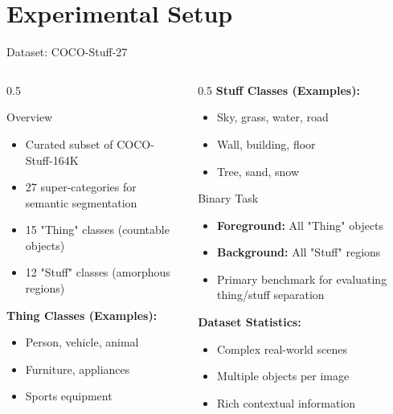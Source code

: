 \documentclass[aspectratio=169]{beamer}
\begin{document}
\section{Experimental Setup}
\begin{frame}{Dataset: COCO-Stuff-27}
\begin{columns}
\begin{column}{0.5\textwidth}
\begin{block}{Overview}
\begin{itemize}
    \item Curated subset of COCO-Stuff-164K
    \item 27 super-categories for semantic segmentation
    \item 15 "Thing" classes (countable objects)
    \item 12 "Stuff" classes (amorphous regions)
\end{itemize}
\end{block}

\textbf{Thing Classes (Examples):}
\begin{itemize}
    \item Person, vehicle, animal
    \item Furniture, appliances
    \item Sports equipment
\end{itemize}
\end{column}

\begin{column}{0.5\textwidth}
\textbf{Stuff Classes (Examples):}
\begin{itemize}
    \item Sky, grass, water, road
    \item Wall, building, floor
    \item Tree, sand, snow
\end{itemize}

\vspace{0.3cm}
\begin{block}{Binary Task}
\begin{itemize}
    \item \textbf{Foreground:} All "Thing" objects
    \item \textbf{Background:} All "Stuff" regions
    \item Primary benchmark for evaluating thing/stuff separation
\end{itemize}
\end{block}

\textbf{Dataset Statistics:}
\begin{itemize}
    \item Complex real-world scenes
    \item Multiple objects per image
    \item Rich contextual information
\end{itemize}
\end{column}
\end{columns}
\end{frame}
\end{document}
